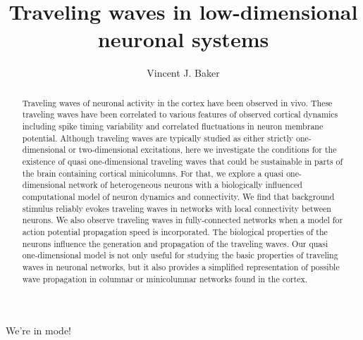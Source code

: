 \documentclass[subfig,blackref,approvalform]{drexel-thesis}
\author{Vincent J. Baker}
\title{Traveling waves in low-dimensional neuronal systems}
\begin{document}
\begin{DUTpreamble} %

\begin{dedications}
We're in  mode!

\Blindtext[3]
\end{dedications}

\begin{acknowledgments}
\Blindtext[3]
\end{acknowledgments}

\tableofcontents
\listoftables
\listoffigures

\begin{abstract}
Traveling waves of neuronal activity in the cortex have been observed in vivo.
These traveling waves have been correlated to various features of observed cortical dynamics including spike timing variability and correlated fluctuations in neuron membrane potential.
Although traveling waves are typically studied as either strictly one-dimensional or two-dimensional excitations, here we investigate the conditions for the existence of quasi  one-dimensional traveling waves that could be sustainable in parts of the brain containing cortical minicolumns.
For that, we explore a quasi  one-dimensional network of heterogeneous neurons with a biologically influenced computational model of neuron dynamics and connectivity.
We find that background stimulus reliably evokes traveling waves in networks with local connectivity between neurons.
We also observe traveling waves in fully-connected networks when a model for action potential propagation speed is incorporated.
The biological properties of the neurons influence the generation and propagation of the traveling waves. 
Our quasi  one-dimensional model is not only useful for studying the basic properties of traveling waves in neuronal networks, but it also provides a simplified representation of possible wave propagation in columnar or minicolumnar networks found in the cortex.

\end{abstract}
\end{DUTpreamble}

\begin{thesis}







\end{thesis}



%

\begin{vita}
\Blindtext[3]
\end{vita}
\end{document}
